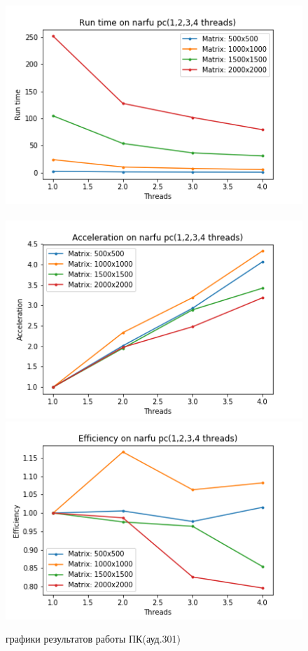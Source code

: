 \documentclass[12pt]{article}
\begin{document}
\begin{figure}
		\includegraphics[scale=0.4]{narfupc/RuntimeNarfupc.png}~
		\includegraphics[scale=0.4]{narfupc/AccelerationNarfupc.png}
		\includegraphics[scale=0.4]{narfupc/EfficiencyNarfupc.png}
		\caption{графики результатов работы ПК(ауд.301)}

	\end{figure}
\end{document}
